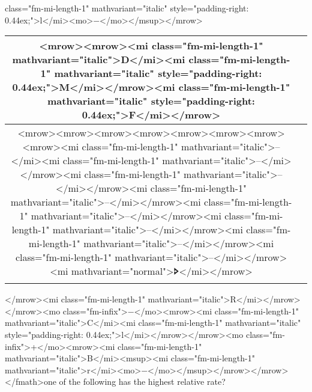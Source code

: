 \documentclass{article}
\begin{document}
class="fm-mi-length-1" mathvariant="italic" style="padding-right: 0.44ex;">l</mi><mo>−</mo></msup></mrow>\begin{tabular}{|c|c|}
\hline
<mrow><mrow><mi class="fm-mi-length-1" mathvariant="italic">D</mi><mi class="fm-mi-length-1" mathvariant="italic" style="padding-right: 0.44ex;">M</mi></mrow><mi class="fm-mi-length-1" mathvariant="italic" style="padding-right: 0.44ex;">F</mi></mrow> \\
\hline
<mrow><mrow><mrow><mrow><mrow><mrow><mrow><mrow><mi class="fm-mi-length-1" mathvariant="italic">–</mi><mi class="fm-mi-length-1" mathvariant="italic">–</mi></mrow><mi class="fm-mi-length-1" mathvariant="italic">–</mi></mrow><mi class="fm-mi-length-1" mathvariant="italic">–</mi></mrow><mi class="fm-mi-length-1" mathvariant="italic">–</mi></mrow><mi class="fm-mi-length-1" mathvariant="italic">–</mi></mrow><mi class="fm-mi-length-1" mathvariant="italic">–</mi></mrow><mi class="fm-mi-length-1" mathvariant="italic">–</mi></mrow><mi mathvariant="normal">🢖</mi></mrow> \\
\hline
\end{tabular}
</mrow><mi class="fm-mi-length-1" mathvariant="italic">R</mi></mrow></mrow><mo class="fm-infix">−</mo><mrow><mi class="fm-mi-length-1" mathvariant="italic">C</mi><mi class="fm-mi-length-1" mathvariant="italic" style="padding-right: 0.44ex;">l</mi></mrow></mrow><mo class="fm-infix">+</mo><mrow><mi class="fm-mi-length-1" mathvariant="italic">B</mi><msup><mi class="fm-mi-length-1" mathvariant="italic">r</mi><mo>−</mo></msup></mrow></mrow></fmath>\newlinewhich one of the following has the highest relative rate? 
\end{document}
